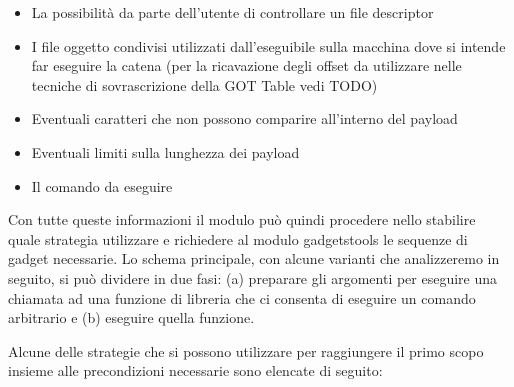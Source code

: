 \begin{itemize}
  \item La possibilità da parte dell'utente di controllare un file
    descriptor

  \item I file oggetto condivisi utilizzati dall'eseguibile sulla
    macchina dove si intende far eseguire la catena (per la
    ricavazione degli offset da utilizzare nelle tecniche di
    sovrascrizione della GOT Table vedi TODO)

  \item Eventuali caratteri che non possono comparire all'interno del
    payload

  \item Eventuali limiti sulla lunghezza dei payload

  \item Il comando da eseguire

\end{itemize}

Con tutte queste informazioni il modulo può quindi procedere nello
stabilire quale strategia utilizzare e richiedere al modulo
gadgetstools le sequenze di gadget necessarie. Lo schema principale,
con alcune varianti che analizzeremo in seguito, si può dividere in
due fasi: (a) preparare gli argomenti per eseguire una chiamata ad una
funzione di libreria che ci consenta di eseguire un comando arbitrario
e (b) eseguire quella funzione.

Alcune delle strategie che si possono utilizzare per raggiungere il
primo scopo insieme alle precondizioni necessarie sono elencate di
seguito:

